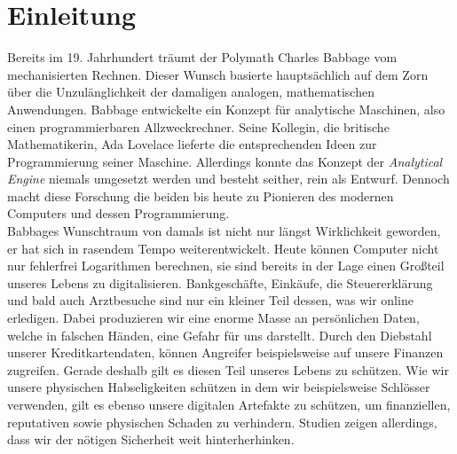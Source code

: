 \documentclass[
    12pt, %
    DIV10,
    ngerman, %
    a4paper, %
    oneside, %
    titlepage, %
    parskip=half, %
    headings=normal, %
    listof=totoc, %
    bibliography=totoc, %
    index=totoc, %
    captions=tableheading, %
    final %
]{scrreprt}
\begin{document}
\newpage
{}
\chapter{Einleitung}
Bereits im 19. Jahrhundert träumt der Polymath Charles Babbage vom mechanisierten Rechnen. Dieser Wunsch basierte hauptsächlich auf dem Zorn über die Unzulänglichkeit der damaligen analogen, mathematischen Anwendungen. Babbage entwickelte ein Konzept für analytische Maschinen, also einen programmierbaren Allzweckrechner. Seine Kollegin, die britische Mathematikerin, Ada Lovelace lieferte die entsprechenden Ideen zur Programmierung seiner Maschine. Allerdings konnte das Konzept der \emph{Analytical Engine} niemals umgesetzt werden und besteht seither, rein als Entwurf. Dennoch macht diese Forschung die beiden bis heute zu Pionieren des modernen Computers und dessen Programmierung.\\
Babbages Wunschtraum von damals ist nicht nur längst Wirklichkeit geworden, er hat sich in rasendem Tempo weiterentwickelt. Heute können Computer nicht nur fehlerfrei Logarithmen berechnen, sie sind bereits in der Lage einen Gro{\ss}teil unseres Lebens zu digitalisieren. Bankgeschäfte, Einkäufe, die Steuererklärung und bald auch Arztbesuche sind nur ein kleiner Teil dessen, was wir online erledigen. Dabei produzieren wir eine enorme Masse an persönlichen Daten, welche in falschen Händen, eine Gefahr für uns darstellt. Durch den Diebstahl unserer Kreditkartendaten, können Angreifer beispielsweise auf unsere Finanzen zugreifen. Gerade deshalb gilt es diesen Teil unseres Lebens zu schützen. Wie wir unsere physischen Habseligkeiten schützen in dem wir beispielsweise Schlösser verwenden, gilt es ebenso unsere digitalen Artefakte zu schützen, um finanziellen, reputativen sowie physischen Schaden zu verhindern. Studien zeigen allerdings, dass wir der nötigen Sicherheit weit hinterherhinken. 
\end{document}
